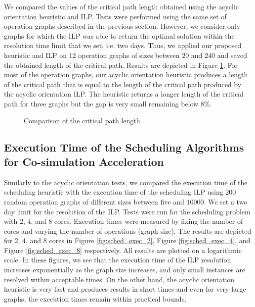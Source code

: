 We compared the values of the critical path length obtained using the acyclic orientation heuristic and ILP. Tests were performed using the same set of operation graphs described in the previous section. However, we consider only graphs for which the ILP was able to return the optimal solution within the resolution time limit that we set, i.e. two days. Thus, we applied our proposed heuristic and ILP on 12 operation graphs of sizes between $20$ and $240$ and saved the obtained length of the critical path. Results are depicted in Figure \ref{fig:orient_critpath}. For most of the operation graphs, our acyclic orientation heuristic produces a length of the critical path that is equal to the length of the critical path produced by the acyclic orientation ILP. The heuristic returns a longer length of the critical path for three graphs but the gap is very small remaining below $8\%$.  

\begin{figure}[phbt]
\centering

\caption{Comparison of the critical path length.}
\label{fig:orient_critpath}
\end{figure}

\subsection{Execution Time of the Scheduling Algorithms for Co-simulation Acceleration}

Similarly to the acyclic orientation tests, we compared the execution time of the scheduling heuristic with the execution time of the scheduling ILP using 200 random operation graphs of different sizes between five and $10000$. We set a two day limit for the resolution of the ILP. Tests were run for the scheduling problem with $2$, $4$, and $8$ cores. Execution times were measured by fixing the number of cores and varying the number of operations (graph size). The results are depicted for $2$, $4$, and $8$ cores in Figure \ref{fig:sched_exec_2}, Figure \ref{fig:sched_exec_4}, and Figure \ref{fig:sched_exec_8} respectively. All results are plotted on a logarithmic scale. In these figures, we see that the execution time of the ILP resolution increases exponentially as the graph size increases, and only small instances are resolved within acceptable times. On the other hand, the acyclic orientation heuristic is very fast and produces results in short times and even for very large graphs, the execution times remain within practical bounds.

